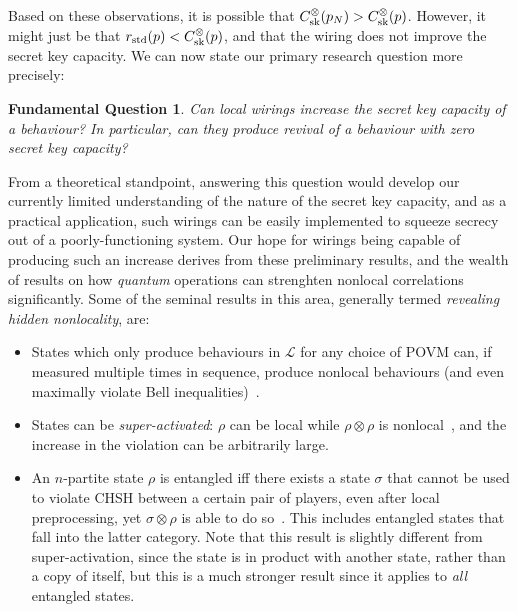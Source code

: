 \documentclass[10pt, a4paper]{article}
\numberwithin{equation}{section} %
\theoremstyle{definition}
\theoremstyle{plain}
\newtheorem{funqn}{Fundamental Question}
\newcommand{\?}{\mathrel{?}} %
\newcommand{\Ls}{\mathcal{L}}
\newcommand{\sk}{\rm sk}
\newcommand{\std}{\rm std}
\begin{document}
              Based on these observations, it is possible that \(C^{\otimes}_{\sk}(p_N) > C^{\otimes}_{\sk}(p)\). However, it might just be that \(r_{\std}(p) < C^{\otimes}_{\sk}(p)\), and that the wiring does not improve the secret key capacity. We can now state our primary research question more precisely:
              \begin{funqn}\label{fqn:wircap}
                Can local wirings increase the secret key capacity of a behaviour? In particular, can they produce revival of a behaviour with zero secret key capacity?
              \end{funqn}

              From a theoretical standpoint, answering this question would develop our currently limited understanding of the nature of the secret key capacity, and as a practical application, such wirings can be easily implemented to squeeze secrecy out of a poorly-functioning system. Our hope for wirings being capable of producing such an increase derives from these preliminary results, and the wealth of results on how \emph{quantum} operations can strenghten nonlocal correlations significantly. Some of the seminal results in this area, generally termed \emph{revealing hidden nonlocality}, are:
              \begin{itemize}
                \item States which only produce behaviours in \(\Ls\) for any choice of POVM can, if measured multiple times in sequence, produce nonlocal behaviours (and even maximally violate Bell inequalities)~\cite{HiddenNLAllMeas}.
                \item States can be \emph{super-activated}: \(\rho\) can be local while \(\rho \otimes \rho\) is nonlocal~\cite{SuperActivationBipartite}, and the increase in the violation can be arbitrarily large.
                \item An \(n\)-partite state \(\rho\) is entangled iff there exists a state \(\sigma\) that cannot be used to violate CHSH between a certain pair of players, even after local preprocessing, yet \(\sigma \otimes \rho\) is able to do so~\cite{AllEntangHidden}. This includes entangled states that fall into the latter category. Note that this result is slightly different from super-activation, since the state is in product with another state, rather than a copy of itself, but this is a much stronger result since it applies to \emph{all} entangled states.
              \end{itemize}
\end{document}
